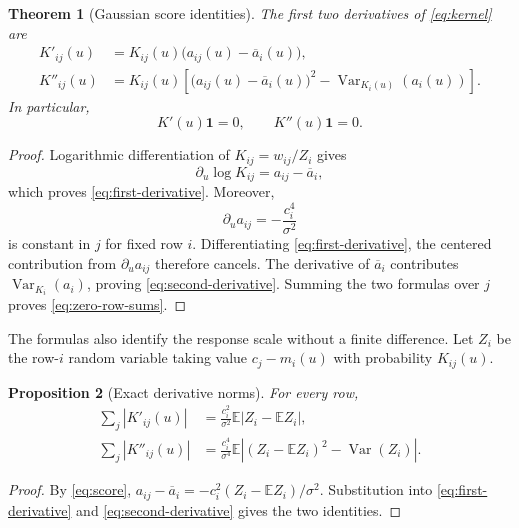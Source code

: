 \documentclass[11pt]{article}
\newtheorem{theorem}{Theorem}[section]
\newtheorem{proposition}[theorem]{Proposition}
\theoremstyle{definition}
\theoremstyle{remark}
\newcommand{\E}{\mathbb E}
\newcommand{\one}{\mathbf 1}
\begin{document}
\begin{theorem}[Gaussian score identities]\label{thm:derivatives}
The first two derivatives of \eqref{eq:kernel} are
\begin{align}
  K'_{ij}(u)
  &=K_{ij}(u)\bigl(a_{ij}(u)-\overline a_i(u)\bigr),
  \label{eq:first-derivative}\\
  K''_{ij}(u)
  &=K_{ij}(u)\left[
    \bigl(a_{ij}(u)-\overline a_i(u)\bigr)^2
    -\operatorname{Var}_{K_i(u)}(a_i(u))
  \right].
  \label{eq:second-derivative}
\end{align}
In particular,
\begin{equation}\label{eq:zero-row-sums}
  K'(u)\one=0,\qquad K''(u)\one=0.
\end{equation}
\end{theorem}

\begin{proof}
Logarithmic differentiation of $K_{ij}=w_{ij}/Z_i$ gives
\[
  \partial_u\log K_{ij}=a_{ij}-\overline a_i,
\]
which proves \eqref{eq:first-derivative}.  Moreover,
\[
  \partial_u a_{ij}=-\frac{c_i^4}{\sigma^2}
\]
is constant in $j$ for fixed row $i$.  Differentiating
\eqref{eq:first-derivative}, the centered contribution from
$\partial_u a_{ij}$ therefore cancels.  The derivative of
$\overline a_i$ contributes
$\operatorname{Var}_{K_i}(a_i)$, proving
\eqref{eq:second-derivative}.  Summing the two formulas over $j$ proves
\eqref{eq:zero-row-sums}.
\end{proof}

The formulas also identify the response scale without a finite difference.
Let $Z_i$ be the row-$i$ random variable taking value
$c_j-m_i(u)$ with probability $K_{ij}(u)$.

\begin{proposition}[Exact derivative norms]\label{prop:derivative-norms}
For every row,
\begin{align}
  \sum_j|K'_{ij}(u)|
  &=
  \frac{c_i^2}{\sigma^2}
  \E\left|Z_i-\E Z_i\right|,
  \label{eq:first-norm}\\
  \sum_j|K''_{ij}(u)|
  &=
  \frac{c_i^4}{\sigma^4}
  \E\left|
    (Z_i-\E Z_i)^2-\operatorname{Var}(Z_i)
  \right|.
  \label{eq:second-norm}
\end{align}
\end{proposition}

\begin{proof}
By \eqref{eq:score},
$a_{ij}-\overline a_i=-c_i^2(Z_i-\E Z_i)/\sigma^2$.
Substitution into \eqref{eq:first-derivative} and
\eqref{eq:second-derivative} gives the two identities.
\end{proof}
\end{document}
